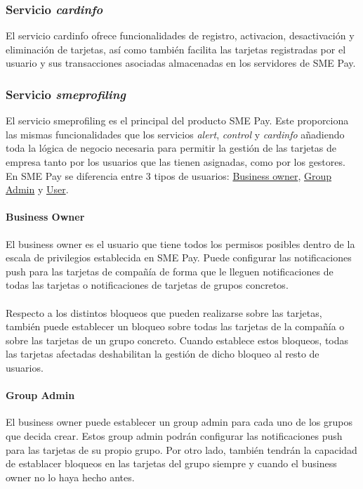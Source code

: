 \documentclass[a4paper, 12pt]{article}
\begin{document}
\subsubsection{Servicio \emph{cardinfo}}
\label{sec-3-1-4}
El servicio cardinfo ofrece funcionalidades de registro, activacion, desactivación y eliminación de tarjetas, así como también facilita las tarjetas registradas
por el usuario y sus transacciones asociadas almacenadas en los servidores de SME Pay.
\subsubsection{Servicio \emph{smeprofiling}}
\label{sec-3-1-5}
El servicio smeprofiling es el principal del producto SME Pay. Este proporciona las mismas funcionalidades que los servicios \emph{alert}, \emph{control} y \emph{cardinfo} añadiendo toda la lógica de negocio necesaria
para permitir la gestión de las tarjetas de empresa tanto por los usuarios que las tienen asignadas, como por los gestores. En SME Pay se diferencia entre 3 tipos de usuarios: \hyperref[sec:bsowner]{Business owner}, \hyperref[sec:gadmin]{Group Admin}
y \hyperref[sec:user]{User}.
\paragraph{Business Owner}
\label{sec-3-1-5-1}
\label{sec:bsowner}
El business owner es el usuario que tiene todos los permisos posibles dentro de la escala de privilegios establecida en SME Pay. Puede configurar las notificaciones push para las tarjetas
de compañía de forma que le lleguen notificaciones de todas las tarjetas o notificaciones de tarjetas de grupos concretos.
\\
\\
Respecto a los distintos bloqueos que pueden realizarse sobre las tarjetas, también puede establecer un bloqueo sobre todas las tarjetas de la compañía o sobre las tarjetas de un grupo concreto. Cuando
establece estos bloqueos, todas las tarjetas afectadas deshabilitan la gestión de dicho bloqueo al resto de usuarios.
\paragraph{Group Admin}
\label{sec-3-1-5-2}
\label{sec:gadmin}
El business owner puede establecer un group admin para cada uno de los grupos que decida crear. Estos group admin podrán configurar las notificaciones push para las tarjetas de su propio grupo.
Por otro lado, también tendrán la capacidad de establacer bloqueos en las tarjetas del grupo siempre y cuando el business owner no lo haya hecho antes.
\end{document}
